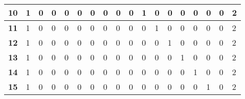 \begin{table}[]
{\begin{tabular}{|P{0.6cm}|P{0.65cm}|P{0.65cm}|P{0.65cm}|P{0.65cm}|P{0.65cm}|P{0.65cm}|P{0.65cm}|P{0.65cm}|P{0.65cm}|P{0.65cm}|P{0.65cm}|P{0.65cm}|P{0.65cm}|P{0.65cm}|P{0.65cm}|P{0.65cm}|P{2.9cm}|}
\textbf{10}                        & 1                     & 0                     & 0                     & 0                     & 0                     & 0                     & 0                     & 0                     & 0                     & 1                     & 0                     & 0                     & 0                     & 0                     & 0                     & 0                     & 2                     \\ \hline
\textbf{11}                        & 1                     & 0                     & 0                     & 0                     & 0                     & 0                     & 0                     & 0                     & 0                     & 0                     & 1                     & 0                     & 0                     & 0                     & 0                     & 0                     & 2                     \\ \hline
\textbf{12}                        & 1                     & 0                     & 0                     & 0                     & 0                     & 0                     & 0                     & 0                     & 0                     & 0                     & 0                     & 1                     & 0                     & 0                     & 0                     & 0                     & 2                     \\ \hline
\textbf{13}                        & 1                     & 0                     & 0                     & 0                     & 0                     & 0                     & 0                     & 0                     & 0                     & 0                     & 0                     & 0                     & 1                     & 0                     & 0                     & 0                     & 2                     \\ \hline
\textbf{14}                        & 1                     & 0                     & 0                     & 0                     & 0                     & 0                     & 0                     & 0                     & 0                     & 0                     & 0                     & 0                     & 0                     & 1                     & 0                     & 0                     & 2                     \\ \hline
\textbf{15}                        & 1                     & 0                     & 0                     & 0                     & 0                     & 0                     & 0                     & 0                     & 0                     & 0                     & 0                     & 0                     & 0                     & 0                     & 1                     & 0                     & 2                     \\ \hline

\end{tabular}}
\end{table}
